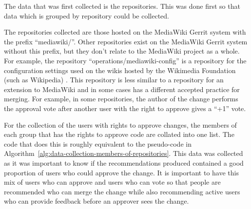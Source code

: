 The data that was first collected is the repositories. This was done first so that data which is grouped by repository could be collected.

The repositories collected are those hosted on the MediaWiki Gerrit system with the prefix ``mediawiki/''. Other repositories exist on the MediaWiki Gerrit system without this prefix, but they don't relate to the MediaWiki project as a whole. For example, the repository ``operations/mediawiki-config'' is a repository for the configuration settings used on the wikis hosted by the Wikimedia Foundation (such as Wikipedia) . This repository is less similar to a repository for an extension to MediaWiki and in some cases has a different accepted practice for merging. For example, in some repositories, the author of the change performs the approval vote after another user with the right to approve gives a ``+1'' vote.

For the collection of the users with rights to approve changes, the members of each group that has the rights to approve code are collated into one list. The code that does this is roughly equivalent to the pseudo-code in Algorithm~\ref{alg:data-collection-members-of-repositories}. This data was collected as it was important to know if the recommendations produced contained a good proportion of users who could approve the change. It is important to have this mix of users who can approve and users who can vote so that people are recommended who can merge the change while also recommending active users who can provide feedback before an approver sees the change.

\begin{algorithm}[H]
	\caption%
	{\label{alg:data-collection-members-of-repositories}Data collection for members of repositories.}
\end{algorithm}

